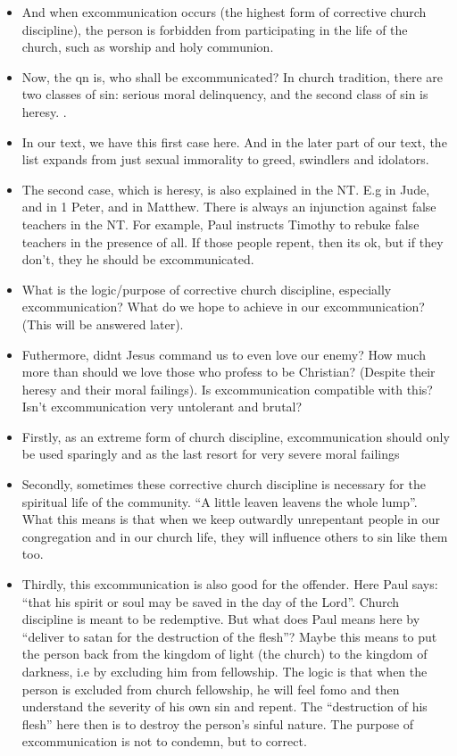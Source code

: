 \begin{itemize}
  \item{And when excommunication occurs (the highest form of corrective church discipline), the person is forbidden from participating in the life of the church, such as worship and holy communion.}
  \item{Now, the qn is, who shall be excommunicated? In church tradition, there are two classes of sin: serious moral delinquency, and the second class of sin is heresy. .}
  \item{In our text, we have this first case here. And in the later part of our text, the list expands from just sexual immorality to greed, swindlers and idolators.}
  \item{The second case, which is heresy, is also explained in the NT. E.g in Jude, and in 1 Peter, and in Matthew. There is always an injunction against false teachers in the NT. For example, Paul instructs Timothy to rebuke false teachers in the presence of all. If those people repent, then its ok, but if they don’t, they he should be excommunicated.}
  \item{What is the logic/purpose of corrective church discipline, especially excommunication? What do we hope to achieve in our excommunication? (This will be answered later).}
  \item{Futhermore, didnt Jesus command us to even love our enemy? How much more than should we love those who profess to be Christian? (Despite their heresy and their moral failings). Is excommunication compatible with this? Isn’t excommunication very untolerant and brutal?}
  \item{Firstly, as an extreme form of church discipline, excommunication should only be used sparingly and as the last resort for very severe moral failings }
  \item{Secondly, sometimes these corrective church discipline is necessary for the spiritual life of the community. “A little leaven leavens the whole lump”. What this means is that when we keep outwardly unrepentant people in our congregation and in our church life, they will influence others to sin like them too.}
  \item{Thirdly, this excommunication is also good for the offender. Here Paul says: “that his spirit or soul may be saved in the day of the Lord”. Church discipline is meant to be redemptive. But what does Paul means here by “deliver to satan for the destruction of the flesh”? Maybe this means to put the person back from the kingdom of light (the church) to the kingdom of darkness, i.e by excluding him from fellowship. The logic is that when the person is excluded from church fellowship, he will feel fomo and then understand the severity of his own sin and repent. The “destruction of his flesh” here then is to destroy the person’s sinful nature. The purpose of excommunication is not to condemn, but to correct.}
\end{itemize}